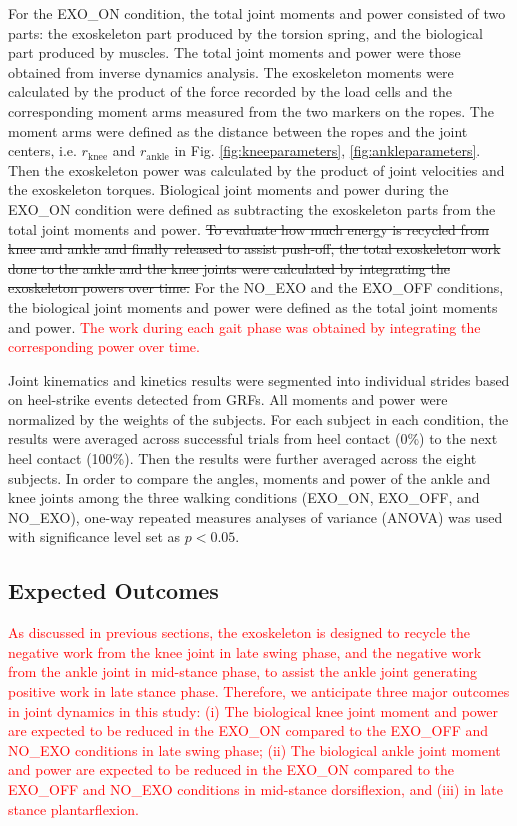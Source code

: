 \documentclass[twocolumn,cleanfoot,10pt]{asme2ej}
\begin{document}
For the EXO\_ON condition, the total joint moments and power consisted of two parts: the exoskeleton part produced by the torsion spring, and the biological part produced by muscles.
The total joint moments and power were those obtained from inverse dynamics analysis.
The exoskeleton moments were calculated by the product of the force recorded by the load cells and the corresponding moment arms measured from the two markers on the ropes.
The moment arms were defined as the distance between the ropes and the joint centers, i.e. $r_\mathrm{knee}$ and $r_\mathrm{ankle}$ in Fig. \ref{fig:kneeparameters}, \ref{fig:ankleparameters}.
Then the exoskeleton power was calculated by the product of joint velocities and the exoskeleton torques.
Biological joint moments and power during the EXO\_ON condition were defined as subtracting the exoskeleton parts from the total joint moments and power.
\sout{To evaluate how much energy is recycled from knee and ankle and finally released to assist push-off, the total exoskeleton work done to the ankle and the knee joints were calculated by integrating the exoskeleton powers over time.}
For the NO\_EXO and the EXO\_OFF conditions, the biological joint moments and power were defined as the total joint moments and power.
\textcolor{red}{The work during each gait phase was obtained by integrating the corresponding power over time.}

Joint kinematics and kinetics results were segmented into individual strides based on heel-strike events detected from GRFs.
All moments and power were normalized by the weights of the subjects.
For each subject in each condition, the results were averaged across successful trials from heel contact (0\%) to the next heel contact (100\%).
Then the results were further averaged across the eight subjects.
In order to compare the angles, moments and power of the ankle and knee joints among the three walking conditions (EXO\_ON, EXO\_OFF, and NO\_EXO), one-way repeated measures analyses of variance (ANOVA) was used with significance level set as $p<0.05$.

\subsection{Expected Outcomes}

\textcolor{red}{As discussed in previous sections, the exoskeleton is designed to recycle the negative work from the knee joint in late swing phase, and the negative work from the ankle joint in mid-stance phase, to assist the ankle joint generating positive work in late stance phase.
Therefore, we anticipate three major outcomes in joint dynamics in this study:
(i) The biological knee joint moment and power are expected to be reduced in the EXO\_ON compared to the EXO\_OFF and NO\_EXO conditions in late swing phase;
(ii) The biological ankle joint moment and power are expected to be reduced in the EXO\_ON compared to the EXO\_OFF and NO\_EXO conditions in mid-stance dorsiflexion, and (iii) in late stance plantarflexion.}
\end{document}
